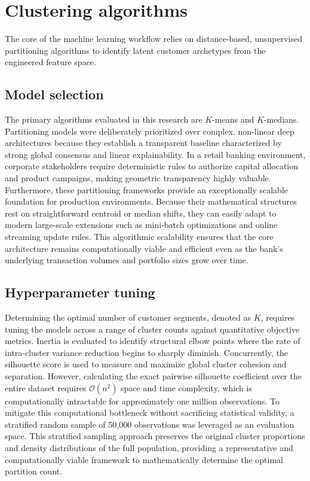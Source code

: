     \section{Clustering algorithms}
    \label{sec:clustering_algorithms}
    The core of the machine learning workflow relies on distance-based, unsupervised partitioning algorithms to identify latent customer archetypes from the engineered feature space.
    
        \subsection{Model selection}
        \label{subsec:model_selection}
        The primary algorithms evaluated in this research are $K$-means and $K$-medians. Partitioning models were deliberately prioritized over complex, non-linear deep architectures because they establish a transparent baseline characterized by strong global consensus and linear explainability. In a retail banking environment, corporate stakeholders require deterministic rules to authorize capital allocation and product campaigns, making geometric transparency highly valuable. Furthermore, these partitioning frameworks provide an exceptionally scalable foundation for production environments. Because their mathematical structures rest on straightforward centroid or median shifts, they can easily adapt to modern large-scale extensions such as mini-batch optimizations and online streaming update rules. This algorithmic scalability ensures that the core architecture remains computationally viable and efficient even as the bank's underlying transaction volumes and portfolio sizes grow over time.
        
        \subsection{Hyperparameter tuning}
        \label{subsec:hyperparameter_tuning}
        Determining the optimal number of customer segments, denoted as $K$, requires tuning the models across a range of cluster counts against quantitative objective metrics. Inertia is evaluated to identify structural elbow points where the rate of intra-cluster variance reduction begins to sharply diminish. Concurrently, the silhouette score is used to measure and maximize global cluster cohesion and separation. However, calculating the exact pairwise silhouette coefficient over the entire dataset requires $\mathcal{O}(n^2)$ space and time complexity, which is computationally intractable for approximately one million observations. To mitigate this computational bottleneck without sacrificing statistical validity, a stratified random sample of 50,000 observations was leveraged as an evaluation space. This stratified sampling approach preserves the original cluster proportions and density distributions of the full population, providing a representative and computationally viable framework to mathematically determine the optimal partition count.
        
